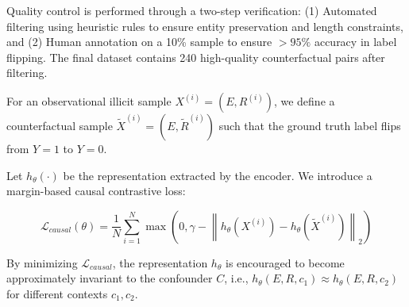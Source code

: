 \documentclass{acmart}
\begin{document}
Quality control is performed through a two-step verification: (1) Automated filtering using heuristic rules to ensure entity preservation and length constraints, and (2) Human annotation on a 10\% sample to ensure $>95\%$ accuracy in label flipping. The final dataset contains 240 high-quality counterfactual pairs after filtering.

\begin{definition}
For an observational illicit sample $X^{(i)} = (E, R^{(i)})$, we define a counterfactual sample $\tilde{X}^{(i)} = (E, \tilde{R}^{(i)})$ such that the ground truth label flips from $Y=1$ to $Y=0$.
\end{definition}

Let $h_\theta(\cdot)$ be the representation extracted by the encoder. We introduce a margin-based causal contrastive loss:

\begin{equation}
\label{eq:ccl_loss}
\mathcal{L}_{causal}(\theta) = \frac{1}{N} \sum_{i=1}^{N} \max \left( 0, \gamma - \left\| h_\theta(X^{(i)}) - h_\theta(\tilde{X}^{(i)}) \right\|_2 \right)
\end{equation}

\begin{proposition}
By minimizing $\mathcal{L}_{causal}$, the representation $h_\theta$ is encouraged to become approximately invariant to the confounder $C$, i.e., $h_\theta(E, R, c_1) \approx h_\theta(E, R, c_2)$ for different contexts $c_1, c_2$.
\end{proposition}
\end{document}
